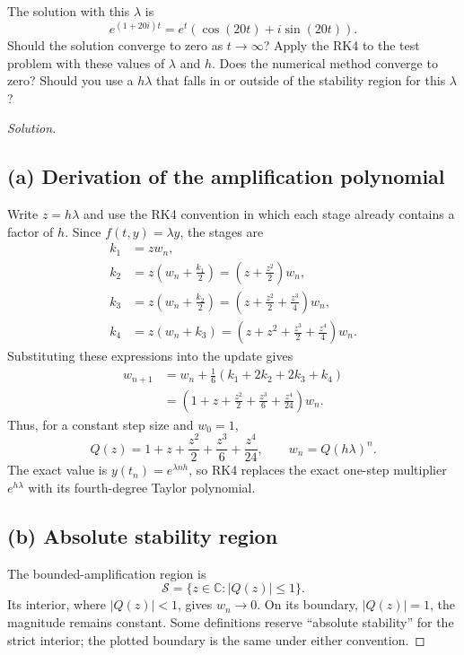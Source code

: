 \documentclass[12pt]{amsart}
\newenvironment{solution}
{\begin{proof}[Solution]}
{\end{proof}}
\begin{document}
\begin{onehalfspace}
\begin{enumerate}
            The solution with this $\lambda$ is
            \[
                e^{(1+20i)t}=e^t(\cos(20t)+i\sin(20t)).
            \]
            Should the solution converge to zero as $t\to\infty$? Apply the RK4 to the test
            problem with these values of $\lambda$ and $h$. Does the numerical method converge to
            zero? Should you use a $h\lambda$ that falls in or outside of the stability region for this
            $\lambda$?
        \end{enumerate}

        \begin{solution}
            \leavevmode\par
            \subsection*{(a) Derivation of the amplification polynomial}
            Write $z=h\lambda$ and use the RK4 convention in which each stage
            already contains a factor of $h$. Since $f(t,y)=\lambda y$, the stages are
            \begin{align*}
                k_1&=zw_n,\\
                k_2&=z\left(w_n+\frac{k_1}{2}\right)
                =\left(z+\frac{z^2}{2}\right)w_n,\\
                k_3&=z\left(w_n+\frac{k_2}{2}\right)
                =\left(z+\frac{z^2}{2}+\frac{z^3}{4}\right)w_n,\\
                k_4&=z(w_n+k_3)
                =\left(z+z^2+\frac{z^3}{2}+\frac{z^4}{4}\right)w_n.
            \end{align*}
            Substituting these expressions into the update gives
            \begin{align*}
                w_{n+1}&=w_n+\frac16(k_1+2k_2+2k_3+k_4)\\
                &=\left(1+z+\frac{z^2}{2}+\frac{z^3}{6}+\frac{z^4}{24}\right)w_n.
            \end{align*}
            Thus, for a constant step size and $w_0=1$,
            \[
                \boxed{Q(z)=1+z+\frac{z^2}{2}+\frac{z^3}{6}+\frac{z^4}{24},
                    \qquad w_n=Q(h\lambda)^n.}
            \]
            The exact value is $y(t_n)=e^{\lambda nh}$, so RK4 replaces the exact
            one-step multiplier $e^{h\lambda}$ with its fourth-degree Taylor polynomial.

            \subsection*{(b) Absolute stability region}
            The bounded-amplification region is
            \[
                \boxed{\mathcal S=\{z\in\mathbb C:|Q(z)|\le1\}.}
            \]
            Its interior, where $|Q(z)|<1$, gives $w_n\to0$. On its boundary,
            $|Q(z)|=1$, the magnitude remains constant. Some definitions reserve
            ``absolute stability'' for the strict interior; the plotted boundary
            is the same under either convention.


\end{solution}
\end{onehalfspace}
\end{document}
